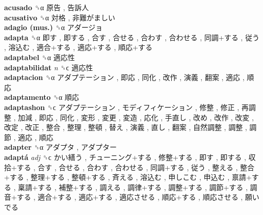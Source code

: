 \textbf{acusado} ␝α   原告 ,  告訴人   \\
\textbf{acusativo} ␝α   対格 ,  非難がましい   \\
\textbf{adagio (mus.)} ␝α   アダージョ   \\
\textbf{adapta} ␝α   即す ,  即する ,  合す ,  合せる ,  合わす ,  合わせる ,  同調+する ,  従う ,  溶込む ,  適合+する ,  適応+する ,  順応+する   \\
\textbf{adaptabel} ␝α   適応性   \\
\textbf{adaptabilidat} \emph{n}  ␝ϲ   適応性   \\
\textbf{adaptacion} ␝α   アダプテーション ,  即応 ,  同化 ,  改作 ,  演義 ,  翻案 ,  適応 ,  順応   \\
\textbf{adaptamento} ␝α   順応   \\
\textbf{adaptashon} ␝ϲ   アダプテーション ,  モディフィケーション ,  修整 ,  修正 ,  再調整 ,  加減 ,  即応 ,  同化 ,  変形 ,  変更 ,  変造 ,  応化 ,  手直し ,  改め ,  改作 ,  改変 ,  改定 ,  改正 ,  整合 ,  整理 ,  整頓 ,  替え ,  演義 ,  直し ,  翻案 ,  自然調整 ,  調整 ,  調節 ,  適応 ,  順応   \\
\textbf{adapter} ␝α   アダプタ ,  アダプター   \\
\textbf{adaptá} \emph{adj}  ␝ϲ   かい繕う ,  チューニング+する ,  修整+する ,  即す ,  即する ,  収拾+する ,  合す ,  合せる ,  合わす ,  合わせる ,  同調+する ,  従う ,  整える ,  整合+する ,  整理+する ,  整頓+する ,  斉える ,  溶込む ,  申しこむ ,  申込む ,  禀請+する ,  稟請+する ,  補整+する ,  調える ,  調律+する ,  調整+する ,  調節+する ,  調音+する ,  適合+する ,  適応+する ,  適応させる ,  順応+する ,  順応させる ,  願いでる   \\
